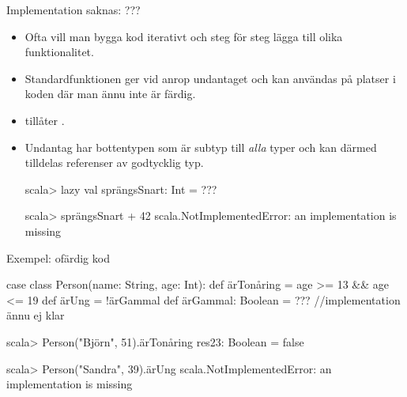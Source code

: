 



\begin{Slide}{Implementation saknas: ???}
\begin{itemize}
\item Ofta vill man bygga kod iterativt och steg för steg lägga till olika funktionalitet.

\item Standardfunktionen  ger vid anrop undantaget  och kan användas på platser i koden där man ännu inte är färdig.

\item {} tillåter .

\pause

\item Undantag har bottentypen  som är subtyp till \emph{alla} typer och kan därmed tilldelas referenser av godtycklig typ.

\begin{REPLnonum}
scala> lazy val sprängsSnart: Int = ???

scala> sprängsSnart + 42
scala.NotImplementedError: an implementation is missing
\end{REPLnonum}

\end{itemize}
\end{Slide}

\begin{Slide}{Exempel: ofärdig kod}
\begin{Code}[basicstyle=\SlideFontSize{9}{11}\ttfamily\selectfont]
case class Person(name: String, age: Int):
  def ärTonåring = age >= 13 && age <= 19
  def ärUng = !ärGammal
  def ärGammal: Boolean = ???   //implementation ännu ej klar
\end{Code}
\begin{REPLnonum}
scala> Person("Björn", 51).ärTonåring
res23: Boolean = false

scala> Person("Sandra", 39).ärUng
scala.NotImplementedError: an implementation is missing
\end{REPLnonum}
\end{Slide}


